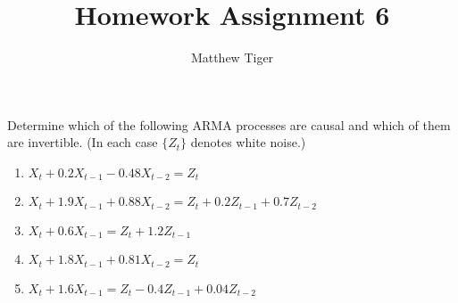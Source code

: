 \documentclass[12pt]{article}
\title{Homework Assignment 6}
\author{Matthew Tiger}
\theoremstyle{definition}
\newenvironment{custompbm}[1]
  {\renewcommand\theproblem{#1}\problem}
  {\endproblem}
\begin{document}
\maketitle


\begin{custompbm}{3.1}
  Determine which of the following ARMA processes are causal and which of them
  are invertible. (In each case $\{ Z_t \}$ denotes white noise.)
  \begin{enumerate}
    \item $X_t + 0.2X_{t-1} - 0.48X_{t-2} = Z_t$
    \item $X_t + 1.9X_{t-1} + 0.88X_{t-2} = Z_t + 0.2Z_{t-1} + 0.7Z_{t-2}$
    \item $X_t + 0.6X_{t-1} = Z_t + 1.2Z_{t-1}$
    \item $X_t + 1.8X_{t-1} + 0.81X_{t-2} = Z_t$
    \item $X_t + 1.6X_{t-1} = Z_t - 0.4Z_{t-1}  + 0.04Z_{t-2} $
  \end{enumerate}
\end{custompbm}
\end{document}
